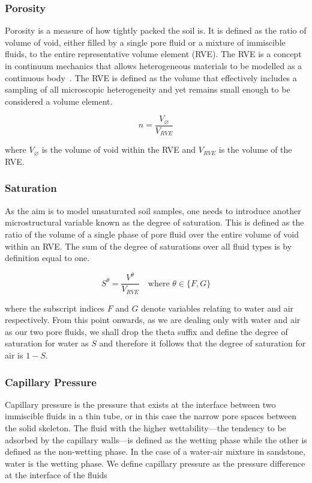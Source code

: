 \documentclass[twocolumn]{article}
\begin{document}
\subsubsection{Porosity}    \label{sec:porosity}
Porosity is a measure of how tightly packed the soil is. It is defined as the ratio of volume of void, either filled by a single pore fluid or a mixture of immiscible fluids, to the entire representative volume element (RVE). The RVE is a concept in continuum mechanics that allows heterogeneous materials to be modelled as a continuous body~\cite{hill_1972}. The RVE is defined as the volume that effectively includes a sampling of all microscopic heterogeneity and yet remains small enough to be considered a volume element.

\begin{equation} \label{eq:porosity}
    n = \frac{V_\varnothing}{V_{RVE}}
\end{equation}

where $V_{\varnothing}$ is the volume of void within the RVE and $V_{RVE}$ is the volume of the RVE.

\subsubsection{Saturation}
As the aim is to model unsaturated soil samples, one needs to introduce another microstructural variable known as the degree of saturation. This is defined as the ratio of the volume of a single phase of pore fluid over the entire volume of void within an RVE. The sum of the degree of saturations over all fluid types is by definition equal to one.

\begin{equation} \label{eq:saturation}
    S^{\theta} = \frac{V^{\theta}}{V_{RVE}} \quad\text{where $\theta \in \{F, G\}$}
\end{equation}

where the subscript indices $F$ and $G$ denote variables relating to water and air respectively. From this point onwards, as we are dealing only with water and air as our two pore fluids, we shall drop the theta suffix and define the degree of saturation for water as $S$ and therefore it follows that the degree of saturation for air is $1 - S$.

\subsubsection{Capillary Pressure}
Capillary pressure is the pressure that exists at the interface between two immiscible fluids in a thin tube, or in this case the narrow pore spaces between the solid skeleton. The fluid with the higher wettability---the tendency to be adsorbed by the capillary walls---is defined as the wetting phase while the other is defined as the non-wetting phase. In the case of a water-air mixture in sandstone, water is the wetting phase. We define capillary pressure as the pressure difference at the interface of the fluids
\end{document}
